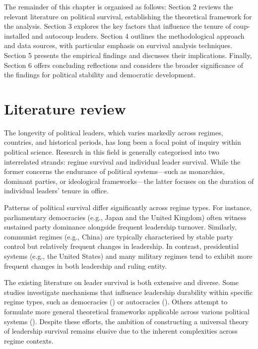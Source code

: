 \documentclass[
  12pt,
]{report}
\begin{document}
The remainder of this chapter is organised as follows: Section 2 reviews
the relevant literature on political survival, establishing the
theoretical framework for the analysis. Section 3 explores the key
factors that influence the tenure of coup-installed and autocoup
leaders. Section 4 outlines the methodological approach and data
sources, with particular emphasis on survival analysis techniques.
Section 5 presents the empirical findings and discusses their
implications. Finally, Section 6 offers concluding reflections and
considers the broader significance of the findings for political
stability and democratic development.

\section{Literature review}\label{literature-review}

The longevity of political leaders, which varies markedly across
regimes, countries, and historical periods, has long been a focal point
of inquiry within political science. Research in this field is generally
categorised into two interrelated strands: regime survival and
individual leader survival. While the former concerns the endurance of
political systems---such as monarchies, dominant parties, or ideological
frameworks---the latter focuses on the duration of individual leaders'
tenure in office.

Patterns of political survival differ significantly across regime types.
For instance, parliamentary democracies (e.g., Japan and the United
Kingdom) often witness sustained party dominance alongside frequent
leadership turnover. Similarly, communist regimes (e.g., China) are
typically characterised by stable party control but relatively frequent
changes in leadership. In contrast, presidential systems (e.g., the
United States) and many military regimes tend to exhibit more frequent
changes in both leadership and ruling entity.

The existing literature on leader survival is both extensive and
diverse. Some studies investigate mechanisms that influence leadership
durability within specific regime types, such as democracies
() or autocracies
(). Others attempt to formulate more general theoretical frameworks
applicable across various political systems
().
Despite these efforts, the ambition of constructing a universal theory
of leadership survival remains elusive due to the inherent complexities
across regime contexts.
\end{document}
